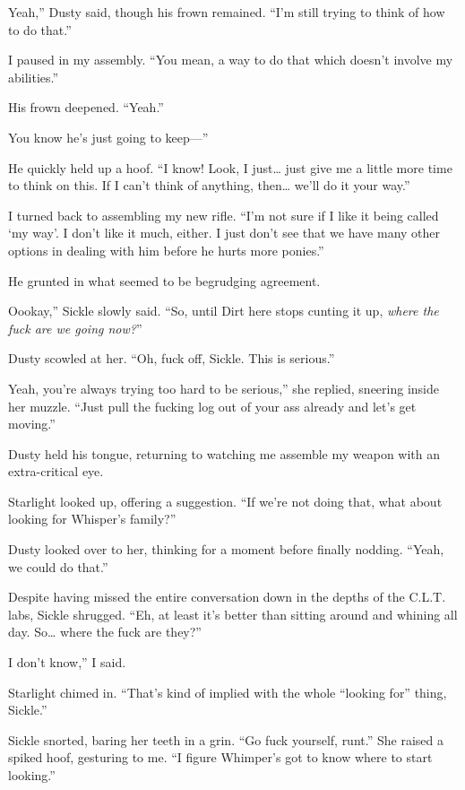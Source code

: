 \leavevmode{}Yeah,” Dusty said, though his frown remained. “I’m still trying to think of how to do that.”

I paused in my assembly. “You mean, a way to do that which doesn’t involve my abilities.”

His frown deepened. “Yeah.”

\leavevmode{}You know he’s just going to keep—”

He quickly held up a hoof. “I know! Look, I just… just give me a little more time to think on this. If I can’t think of anything, then… we’ll do it your way.”

I turned back to assembling my new rifle. “I’m not sure if I like it being called ‘my way’. I don’t like it much, either. I just don’t see that we have many other options in dealing with him before he hurts more ponies.”

He grunted in what seemed to be begrudging agreement.

\leavevmode{}Oookay,” Sickle slowly said. “So, until Dirt here stops cunting it up, \textit{where the fuck are we going now?}”

Dusty scowled at her. “Oh, fuck off, Sickle. This is serious.”

\leavevmode{}Yeah, you’re always trying too hard to be serious,” she replied, sneering inside her muzzle. “Just pull the fucking log out of your ass already and let’s get moving.”

Dusty held his tongue, returning to watching me assemble my weapon with an extra-critical eye.

Starlight looked up, offering a suggestion. “If we’re not doing that, what about looking for Whisper’s family?”

Dusty looked over to her, thinking for a moment before finally nodding. “Yeah, we could do that.”

Despite having missed the entire conversation down in the depths of the C.L.T. labs, Sickle shrugged. “Eh, at least it’s better than sitting around and whining all day. So… where the fuck are they?”

\leavevmode{}I don’t know,” I said.

Starlight chimed in. “That’s kind of implied with the whole “looking for” thing, Sickle.”

Sickle snorted, baring her teeth in a grin. “Go fuck yourself, runt.” She raised a spiked hoof, gesturing to me. “I figure Whimper’s got to know where to start looking.”

